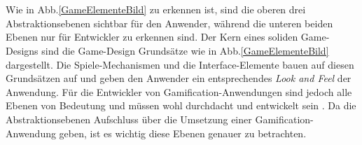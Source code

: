 \documentclass[a4paper,12pt]{scrartcl}
\begin{document}
\\\\
Wie in Abb.\ref{GameElementeBild} zu erkennen ist, sind die oberen drei Abstraktionsebenen sichtbar für den Anwender, während die unteren beiden Ebenen nur für Entwickler zu erkennen sind. Der Kern eines soliden Game-Designs sind die Game-Design Grundsätze wie in Abb.\ref{GameElementeBild} dargestellt. Die Spiele-Mechanismen und die Interface-Elemente bauen auf diesen Grundsätzen auf und geben den Anwender ein entsprechendes \textit{Look and Feel} der Anwendung. Für die Entwickler von Gamification-Anwendungen sind jedoch alle Ebenen von Bedeutung und müssen wohl durchdacht und entwickelt sein \cite{GameElemente2018}. Da die Abstraktionsebenen Aufschluss über die Umsetzung einer Gamification-Anwendung geben, ist es wichtig diese Ebenen genauer zu betrachten.
\end{document}
